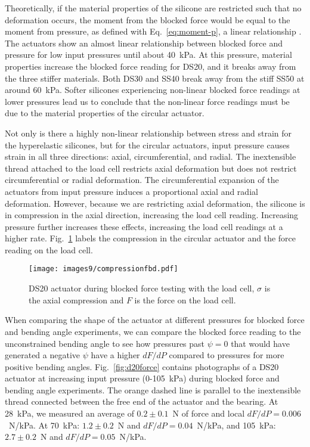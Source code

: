 Theoretically, if the material properties of the silicone are restricted such that no deformation occurs, the moment from the blocked force would be equal to the moment from pressure, as defined with Eq.~\ref{eq:moment-p}, a linear relationship \cite{polygerinos_modeling_2015}. The actuators show an almost linear relationship between blocked force and pressure for low input pressures until about 40~kPa. At this pressure, material properties increase the blocked force reading for DS20, and it breaks away from the three stiffer materials. Both DS30 and SS40 break away from the stiff SS50 at around 60~kPa. Softer silicones experiencing non-linear blocked force readings at lower pressures lead us to conclude that the non-linear force readings must be due to the material properties of the circular actuator.

Not only is there a highly non-linear relationship between stress and strain for the hyperelastic silicones, but for the circular actuators, input pressure causes strain in all three directions: axial, circumferential, and radial. The inextensible thread attached to the load cell restricts axial deformation but does not restrict circumferential or radial deformation. The circumferential expansion of the actuators from input pressure induces a proportional axial and radial deformation. However, because we are restricting axial deformation, the silicone is in compression in the axial direction, increasing the load cell reading. Increasing pressure further increases these effects, increasing the load cell readings at a higher rate. Fig.~\ref{fig:compressionfbd} labels the compression in the circular actuator and the force reading on the load cell. \\

\begin{figure}[!ht]
    \centering
     \texttt{[image: images9/compressionfbd.pdf]}
    \caption{DS20 actuator during blocked force testing with the load cell, $\sigma$ is the axial compression and $F$ is the force on the load cell.}
    \label{fig:compressionfbd}
\end{figure}

\clearpage
When comparing the shape of the actuator at different pressures for blocked force and bending angle experiments, we can compare the blocked force reading to the unconstrained bending angle to see how pressures past $\psi=0$ that would have generated a negative $\psi$ have a higher $dF/dP$ compared to pressures for more positive bending angles. Fig.~\ref{fig:d20force} contains photographs of a DS20 actuator at increasing input pressure (0-105~kPa) during blocked force and bending angle experiments. The orange dashed line is parallel to the inextensible thread connected between the free end of the actuator and the bearing. At 28~kPa, we measured an average of $0.2\pm0.1$~N of force and local $dF/dP=0.006$~N/kPa. At 70~kPa: $1.2\pm0.2$~N and $dF/dP=0.04$~N/kPa, and 105~kPa: $2.7\pm0.2$~N and $dF/dP=0.05$~N/kPa. 


